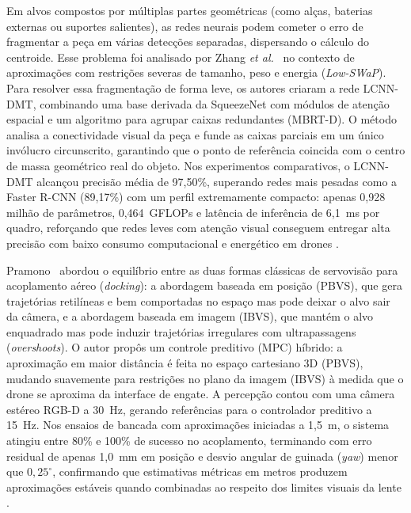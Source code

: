 Em alvos compostos por múltiplas partes geométricas (como alças, baterias externas ou suportes salientes), as redes neurais podem cometer o erro de fragmentar a peça em várias detecções separadas, dispersando o cálculo do centroide. Esse problema foi analisado por Zhang \textit{et al.}~\cite{remotesensing2024} no contexto de aproximações com restrições severas de tamanho, peso e energia (\textit{Low-SWaP}). Para resolver essa fragmentação de forma leve, os autores criaram a rede LCNN-DMT, combinando uma base derivada da SqueezeNet com módulos de atenção espacial e um algoritmo para agrupar caixas redundantes (MBRT-D). O método analisa a conectividade visual da peça e funde as caixas parciais em um único invólucro circunscrito, garantindo que o ponto de referência coincida com o centro de massa geométrico real do objeto. Nos experimentos comparativos, o LCNN-DMT alcançou precisão média de 97,50\%, superando redes mais pesadas como a Faster R-CNN (89,17\%) com um perfil extremamente compacto: apenas 0,928 milhão de parâmetros, 0,464~GFLOPs e latência de inferência de 6,1~ms por quadro, reforçando que redes leves com atenção visual conseguem entregar alta precisão com baixo consumo computacional e energético em drones \cite{remotesensing2024}.


Pramono~\cite{pramono2025} abordou o equilíbrio entre as duas formas clássicas de servovisão para acoplamento aéreo (\textit{docking}): a abordagem baseada em posição (PBVS), que gera trajetórias retilíneas e bem comportadas no espaço mas pode deixar o alvo sair da câmera, e a abordagem baseada em imagem (IBVS), que mantém o alvo enquadrado mas pode induzir trajetórias irregulares com ultrapassagens (\textit{overshoots}). O autor propôs um controle preditivo (MPC) híbrido: a aproximação em maior distância é feita no espaço cartesiano 3D (PBVS), mudando suavemente para restrições no plano da imagem (IBVS) à medida que o drone se aproxima da interface de engate. A percepção contou com uma câmera estéreo RGB-D a 30~Hz, gerando referências para o controlador preditivo a 15~Hz. Nos ensaios de bancada com aproximações iniciadas a 1,5~m, o sistema atingiu entre 80\% e 100\% de sucesso no acoplamento, terminando com erro residual de apenas 1,0~mm em posição e desvio angular de guinada (\textit{yaw}) menor que $0{,}25^\circ$, confirmando que estimativas métricas em metros produzem aproximações estáveis quando combinadas ao respeito dos limites visuais da lente \cite{pramono2025}.

